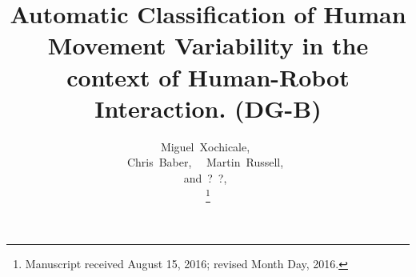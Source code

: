 \documentclass[9pt,journal,onecolumn,compsoc]{IEEEtran}
\begin{document}
%
\title{
  Automatic Classification of  Human Movement Variability  in the context of  Human-Robot Interaction. (DG-B)
}





%
%
%
%

\author{
 	Miguel~Xochicale,~\\
         Chris~Baber,~
         ~Martin~Russell,~ \\
         and~?~?,~

\thanks{Manuscript received August 15, 2016; revised Month Day, 2016.}
}
\end{document}
